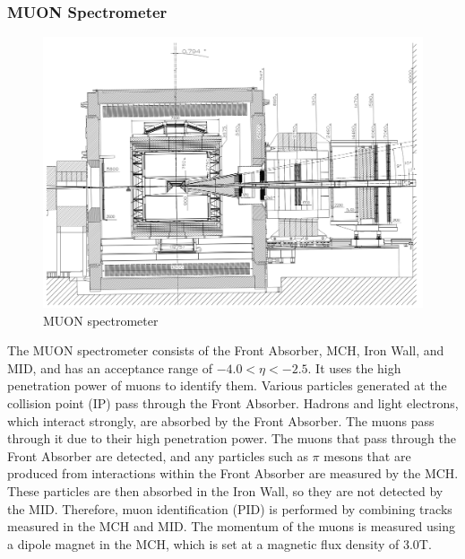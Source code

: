         \subsubsection{MUON Spectrometer}
            \begin{figure}
                \centering
                \includegraphics[keepaspectratio, scale=0.25]{fig/2_2_MUONspectrometer.png}
                \caption{MUON spectrometer}
            \end{figure}
            The MUON spectrometer consists of the Front Absorber, MCH, Iron Wall, and MID, and has an acceptance range of $-4.0 < \eta < -2.5$. It uses the high penetration power of muons to identify them. Various particles generated at the collision point (IP) pass through the Front Absorber. Hadrons and light electrons, which interact strongly, are absorbed by the Front Absorber. The muons pass through it due to their high penetration power. The muons that pass through the Front Absorber are detected, and any particles such as $\pi$ mesons that are produced from interactions within the Front Absorber are measured by the MCH. These particles are then absorbed in the Iron Wall, so they are not detected by the MID. Therefore, muon identification (PID) is performed by combining tracks measured in the MCH and MID. The momentum of the muons is measured using a dipole magnet in the MCH, which is set at a magnetic flux density of 3.0T.

